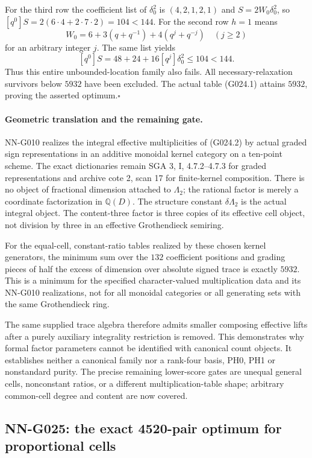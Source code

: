 For the third row the coefficient list of $\delta_0^2$
is $(4,2,1,2,1)$ and $S=2W_0\delta_0^2$, so
$[q^0]S=2(6\cdot4+2\cdot7\cdot2)=104<144$.
For the second row $h=1$ means
\[
 W_0=6+3(q+q^{-1})+4(q^j+q^{-j})\quad(j\ge2)
\]
for an arbitrary integer $j$. The same list yields
\[
 [q^0]S=48+24+16[q^j]\delta_0^2\le104<144.
\]
Thus this entire unbounded-location family also fails.
All necessary-relaxation survivors below $5932$ have
been excluded. The actual table (G024.1) attains $5932$,
proving the asserted optimum.\hfill$\square$

\paragraph{Geometric translation and the remaining gate.}
NN-G010 realizes the integral effective multiplicities of
(G024.2) by actual graded sign representations in an
additive monoidal kernel category on a ten-point scheme.
The exact dictionaries remain SGA 3, I, 4.7.2--4.7.3
for graded representations and archive cote 2, scan 17
for finite-kernel composition. There is no object of
fractional dimension attached to $\Lambda_2$; the rational
factor is merely a coordinate factorization in $\mathbb Q(D)$.
The structure constant $\delta\Lambda_2$ is the actual
integral object. The content-three factor is three copies
of its effective cell object, not division by three in
an effective Grothendieck semiring.

For the equal-cell, constant-ratio tables realized by these
chosen kernel generators, the minimum sum over the $132$
coefficient positions and grading pieces of half the excess of dimension over
absolute signed trace is exactly $5932$. This is a minimum
for the specified character-valued multiplication data and
its NN-G010 realizations, not for all monoidal categories
or all generating sets with the same Grothendieck ring.

The same supplied trace algebra therefore admits smaller
composing effective lifts after a purely auxiliary
integrality restriction is removed. This demonstrates
why formal factor parameters cannot be identified with
canonical count objects. It establishes neither a
canonical family nor a rank-four basis, PH0, PH1 or
nonstandard purity. The precise remaining lower-score
gates are unequal general cells, nonconstant ratios,
or a different multiplication-table shape; arbitrary
common-cell degree and content are now covered.

\subsection{NN-G025: the exact 4520-pair optimum for proportional cells}
